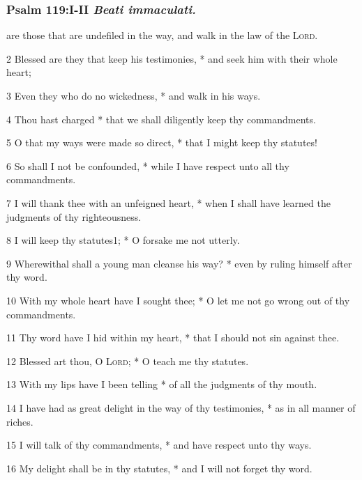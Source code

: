 \subsubsection{Psalm 119:I-II \textit{Beati immaculati.}}
 are those that are undefiled in the way, and walk in the law of the \textsc{Lord}.\par
2 Blessed are they that keep his testimonies, * and seek him with their whole heart;\par
3 Even they who do no wickedness, * and walk in his ways.\par
4 Thou hast charged * that we shall diligently keep thy commandments.\par
5 O that my ways were made so direct, * that I might keep thy statutes!\par
6 So shall I not be confounded, * while I have respect unto all thy commandments.\par
7 I will thank thee with an unfeigned heart, * when I shall have learned the judgments of thy righteousness.\par   
8 I will keep thy statutes1; * O forsake me not utterly.
\par
9 Wherewithal shall a young man cleanse his way? * even by ruling himself after thy word.\par
10 With my whole heart have I sought thee; * O let me not go wrong out of thy commandments.\par
11 Thy word have I hid within my heart, * that I should not sin against thee.\par
12 Blessed art thou, O \textsc{Lord}; * O teach me thy statutes.\par
13 With my lips have I been telling * of all the judgments of thy mouth.\par
14 I have had as great delight in the way of thy testimonies, * as in all manner of riches.\par
15 I will talk of thy commandments, * and have respect unto thy ways.\par
16 My delight shall be in thy statutes, * and I will not forget thy word.
